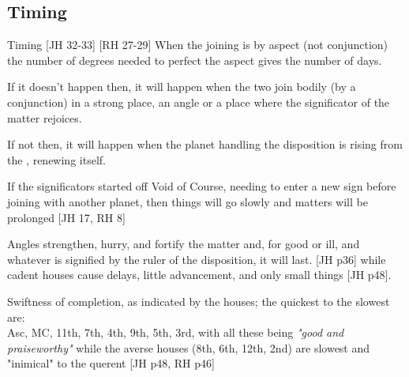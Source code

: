 \subsection{Timing}
\begin{frame}[t]{Timing  [JH 32-33] [RH 27-29]}
When the joining is by aspect (not conjunction) the number of degrees needed to perfect the aspect gives the number of days.

If it doesn't happen then, it will happen when the two join bodily (by a conjunction) in a strong place, an angle or a place where the significator of the matter rejoices.

If not then, it will happen when the planet handling the disposition is rising from the \Sun, renewing itself.

If the significators started off Void of Course, needing to enter a new sign before joining with  another planet, then things will go slowly and matters will be prolonged [JH 17, RH 8]

Angles strengthen, hurry, and fortify the matter and, for good or ill, and whatever is signified by the ruler of the disposition, it will last. [JH p36] while cadent houses cause delays, little advancement, and only small things [JH p48].

Swiftness of completion, as indicated by the houses; the quickest to the slowest are: \\
Asc, MC, 11th, 7th, 4th, 9th, 5th, 3rd,  with all these being \textsl{"good and praiseworthy"} while the averse houses (8th, 6th, 12th, 2nd) are slowest and "inimical" to the querent [JH p48, RH p46]

\end{frame}